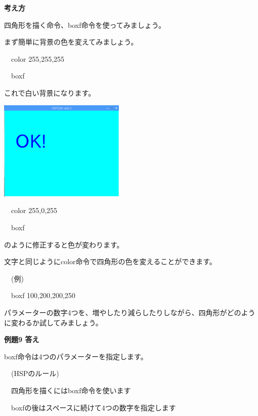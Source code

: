 \documentclass[a4paper,12pt]{jarticle}
\begin{document}
{\bfseries
考え方}

\bigskip

四角形を描く命令、boxf命令を使ってみましょう。

まず簡単に背景の色を変えてみましょう。

\ \ color 255,255,255

\ \ boxf

これで白い背景になります。

\bigskip
\bigskip

\begin{minipage}{9.781cm}
\centering
{\upshape
\includegraphics[keepaspectratio,width=6.006cm,height=4.77cm]{text02-img/text02-img036.png}}
\end{minipage}

\bigskip
\bigskip
\bigskip

\ \ color 255,0,255

\ \ boxf

\bigskip

のように修正すると色が変わります。

文字と同じようにcolor命令で四角形の色を変えることができます。

\bigskip

\ \ (例)

\ \ boxf 100,200,200,250


\bigskip

パラメーターの数字4つを、増やしたり減らしたりしながら、四角形がどのように変わるか試してみましょう。


\bigskip


\bigskip

{\bfseries
例題9 答え}

\bigskip

boxf命令は4つのパラメーターを指定します。


\bigskip

\ \ (HSPのルール)


\bigskip

\ \ 四角形を描くにはboxf命令を使います

\ \ boxfの後はスペースに続けて4つの数字を指定します
\end{document}
